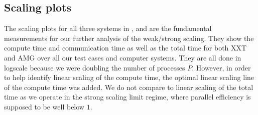 \documentclass{sig-alternate}
\begin{document}
\subsection{Scaling plots}

The scaling plots for all three
systems in ,  and  are the fundamental
measurements for our further analysis of the weak/strong scaling. They show the compute time and
communication time as well as the total time for both XXT and AMG over all our
test cases and computer systems. They are all done in logscale because we were
doubling the number of processes $P$. However, in order to help identify linear scaling of the
compute time, the optimal linear scaling line of the compute time was added. We
do not compare to linear scaling of the total time as we operate in the strong
scaling limit regime, where parallel efficiency is supposed to be well below $1$.
\end{document}
